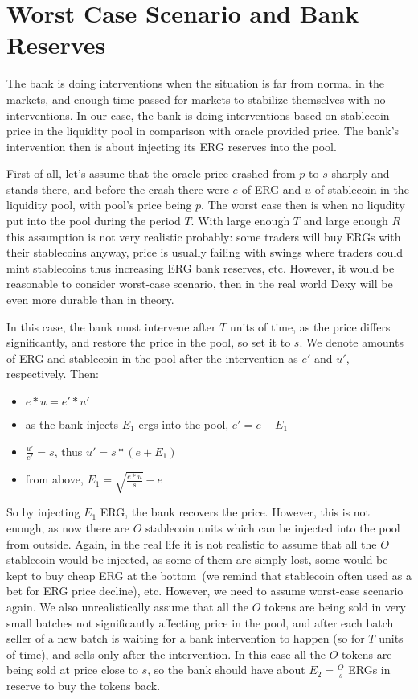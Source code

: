 \documentclass{article}   %
\newcommand{\bc}{ERG}
\newcommand{\sct}{stablecoin}
\newcommand{\dx}{Dexy}
\begin{document}
\section{Worst Case Scenario and Bank Reserves}

The bank is doing interventions when the situation is far from normal in the markets, and enough time passed for markets to stabilize themselves with no interventions. In our case, the bank is doing interventions based on stablecoin price in the liquidity pool in comparison with oracle provided price. The bank's intervention then is about injecting its \bc{} reserves into the pool.  

First of all, let's assume that the oracle price crashed from $p$ to $s$ sharply and stands there, and before the crash there were $e$ of \bc{} and $u$ of \sct{} in the liquidity pool, with pool's price being $p$. The worst case then is when no liqudity put into the pool during the period $T$. With large enough $T$ and large enough $R$ this assumption is not very realistic probably: some traders will buy \bc{}s with their \sct{}s anyway, price is usually failing with swings where traders could mint \sct{}s thus increasing \bc{} bank reserves, etc. However, it would be reasonable to consider worst-case scenario, then in the real world \dx{} will be even more durable than in theory. 

In this case, the bank must intervene after $T$ units of time, as the price differs significantly, and restore the price in the pool, so set it to $s$. We denote amounts of \bc{} and \sct{} in the pool after the intervention as $e'$ and $u'$, respectively. Then:

\begin{itemize}
  \item{} $e * u = e' * u'$
  \item{} as the bank injects $E_1$ ergs into the pool, $e' = e + E_1$
  \item{} $\frac{u'}{e'} = s$, thus $u' = s * (e + E_1)$ 
  \item{} from above, $E_1 = \sqrt{\frac{e * u}{s}} - e$
\end{itemize}

So by injecting $E_1$ \bc{}, the bank recovers the price. However, this is not enough, as now there are $O$ \sct{} units which can be injected into the pool from outside. 
Again, in the real life it is not realistic to assume that all the $O$ \sct{} would be injected, as some of them are simply lost, some would be kept to buy cheap ERG at the bottom~(we remind that \sct{} often used as a bet for \bc{} price decline), etc. However, we need to assume worst-case scenario again. We also unrealistically assume that all the $O$ tokens are being sold in very small batches not significantly affecting price in the pool, and after each batch seller of a new batch is waiting for a bank intervention to happen (so for $T$ units of time), and sells only after the intervention. In this case all the $O$ tokens are being sold at price close to $s$, so the bank should have about $E_2 = \frac{O}{s}$ \bc{}s in reserve to buy the tokens back.
\end{document}
